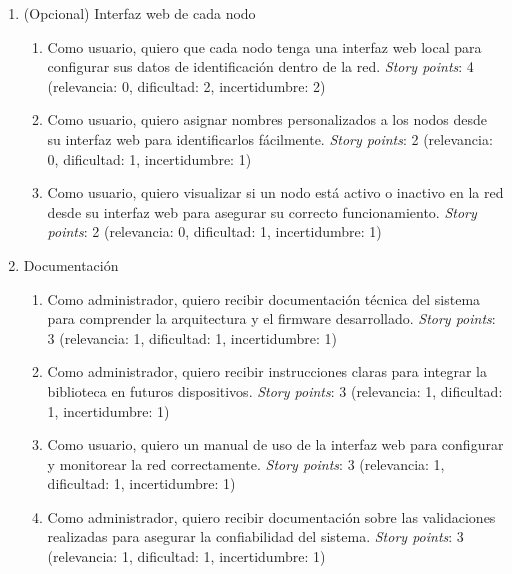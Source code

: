 \documentclass[
11pt, %
]{charter}
\begin{document}
\begin{enumerate}
\begin{enumerate}
\end{enumerate}

\item (Opcional) Interfaz web de cada nodo
\begin{enumerate}
	\item Como usuario, quiero que cada nodo tenga una interfaz web local para configurar sus datos de identificación dentro de la red. \textit{Story points}: 4 (relevancia: 0, dificultad: 2, incertidumbre: 2)

	\item Como usuario, quiero asignar nombres personalizados a los nodos desde su interfaz web para identificarlos fácilmente. \textit{Story points}: 2 (relevancia: 0, dificultad: 1, incertidumbre: 1)

	\item Como usuario, quiero visualizar si un nodo está activo o inactivo en la red desde su interfaz web para asegurar su correcto funcionamiento. \textit{Story points}: 2 (relevancia: 0, dificultad: 1, incertidumbre: 1)

\end{enumerate}

\item Documentación 
\begin{enumerate}
	\item Como administrador, quiero recibir documentación técnica del sistema para comprender la arquitectura y el firmware desarrollado. \textit{Story points}: 3 (relevancia: 1, dificultad: 1, incertidumbre: 1)

	\item Como administrador, quiero recibir instrucciones claras para integrar la biblioteca en futuros dispositivos. \textit{Story points}: 3 (relevancia: 1, dificultad: 1, incertidumbre: 1)

	\item Como usuario, quiero un manual de uso de la interfaz web para configurar y monitorear la red correctamente. \textit{Story points}: 3 (relevancia: 1, dificultad: 1, incertidumbre: 1)

	\item Como administrador, quiero recibir documentación sobre las validaciones realizadas para asegurar la confiabilidad del sistema. \textit{Story points}: 3 (relevancia: 1, dificultad: 1, incertidumbre: 1)

\end{enumerate}

\end{enumerate}
\end{document}
